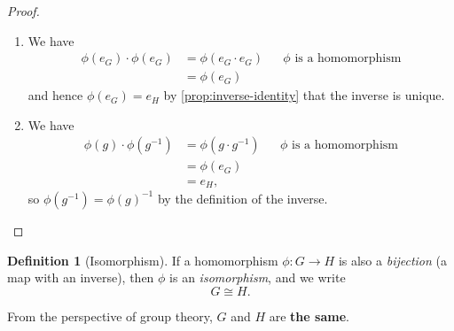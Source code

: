 \documentclass{article}
\theoremstyle{definition}
\newtheorem{definition}[theorem]{Definition}
\theoremstyle{remark}
\newcommand{\pqty}[1]{\left(#1\right)}
\newcommand{\functiondomain}[3]{#1:#2\to #3}
\newcommand{\inverse}{^{-1}}
\newcommand{\isomorphic}{\cong}
\begin{document}
\begin{proof}
    \begin{enumerate}
        \item We have
        \begin{align*}
            \phi\pqty{e_G} \cdot \phi\pqty{e_G} &= \phi\pqty{e_G \cdot e_G} && \phi \text{ is a homomorphism} \\
            &= \phi\pqty{e_G}
        \end{align*}
        and hence \(\phi\pqty{e_G} = e_H\) by \autoref{prop:inverse-identity} that the inverse is unique.

        \item We have
        \begin{align*}
            \phi\pqty{g} \cdot \phi\pqty{g \inverse} &= \phi\pqty{g \cdot g\inverse} && \phi \text{ is a homomorphism} \\
            &= \phi\pqty{e_G} \\
            &= e_H,
        \end{align*}
        so \(\phi\pqty{g \inverse} = \phi\pqty{g}\inverse\) by the definition of the inverse.
    \end{enumerate}
\end{proof}

\begin{definition}[Isomorphism]
    \label{def:isomorphism}%
    If a homomorphism \(\functiondomain{\phi}{G}{H}\) is also a \emph{bijection} (a map with an inverse), then \(\phi\) is an \emph{isomorphism}, and we write
    \[
        G \isomorphic H. 
    \]
\end{definition}

From the perspective of group theory, \(G\) and \(H\) are \textbf{the same}.
\end{document}
